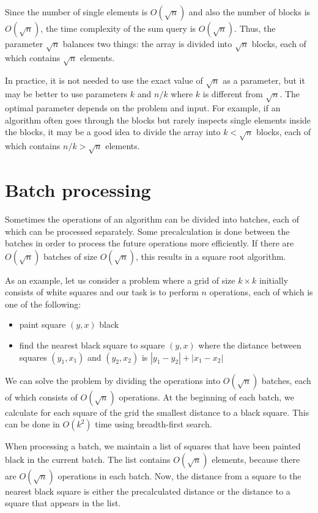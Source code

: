 Since the number of single elements is $O(\sqrt n)$
and also the number of blocks is $O(\sqrt n)$,
the time complexity of the sum query is $O(\sqrt n)$.
Thus, the parameter $\sqrt n$ balances two things:
the array is divided into $\sqrt n$ blocks,
each of which contains $\sqrt n$ elements.

In practice, it is not needed to use the
exact value of $\sqrt n$ as a parameter, but it may be better to
use parameters $k$ and $n/k$ where $k$ is
different from $\sqrt n$.
The optimal parameter depends on the problem and input.
For example, if an algorithm often goes
through the blocks but rarely inspects
single elements inside the blocks,
it may be a good idea to divide the array into
$k < \sqrt n$ blocks, each of which contains $n/k > \sqrt n$
elements.

\section{Batch processing}


Sometimes the operations of an algorithm
can be divided into batches,
each of which can be processed separately.
Some precalculation is done
between the batches
in order to process the future operations more efficiently.
If there are $O(\sqrt n)$ batches of size $O(\sqrt n)$,
this results in a square root algorithm.

As an example, let us consider a problem
where a grid of size $k \times k$
initially consists of white squares
and our task is to perform $n$ operations,
each of which is one of the following:
\begin{itemize}
\item
paint square $(y,x)$ black
\item
find the nearest black square to
square $(y,x)$ where the distance
between squares $(y_1,x_1)$ and $(y_2,x_2)$
is $|y_1-y_2|+|x_1-x_2|$
\end{itemize}

We can solve the problem by dividing
the operations into
$O(\sqrt n)$ batches, each of which consists
of $O(\sqrt n)$ operations.
At the beginning of each batch,
we calculate for each square of the grid
the smallest distance to a black square.
This can be done in $O(k^2)$ time using breadth-first search.

When processing a batch, we maintain a list of squares
that have been painted black in the current batch.
The list contains $O(\sqrt n)$ elements,
because there are $O(\sqrt n)$ operations in each batch.
Now, the distance from a square to the nearest black
square is either the precalculated distance or the distance
to a square that appears in the list.

